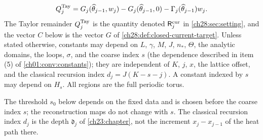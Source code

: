 \begin{definition}
\[\]
\[
 Q_j^{\rm Tay}=G_j(\widehat\theta_{j-1},w_j)-G_j(\widehat\theta_{j-1},0)-\Gamma_j(\widehat\theta_{j-1})w_j.
\]
The Taylor remainder $Q_j^{\rm Tay}$ is the quantity denoted $\mathsf R_j^{\rm cur}$ in \cref{ch28:sec:setting}, and the vector $C$ below is the vector $G$ of \cref{ch28:def:closed-current-target}.
Unless stated otherwise, constants may depend on $L$, $\gamma$, $M$, $J$, $n_*$, $\Theta$, the analytic domains, the loops, $\sigma$, and the coarse index $s$ (the dependence described in item (5) of \cref{ch01:conv:constants}); they are independent of $K$, $j$, $x$, the lattice offset, and the classical recursion index $d_j=J(K-s-j)$. A constant indexed by $s$ may depend on $H_s$. All regions are the full periodic torus.
\end{definition}

The threshold $s_0$ below depends on the fixed data and is chosen before the coarse index $s$; the reconstruction maps do not change with $s$. The classical recursion index $d_j$ is the depth $\mathfrak d_j$ of \cref{ch23:chapter}, not the increment $x_j-x_{j-1}$ of the heat path there.

